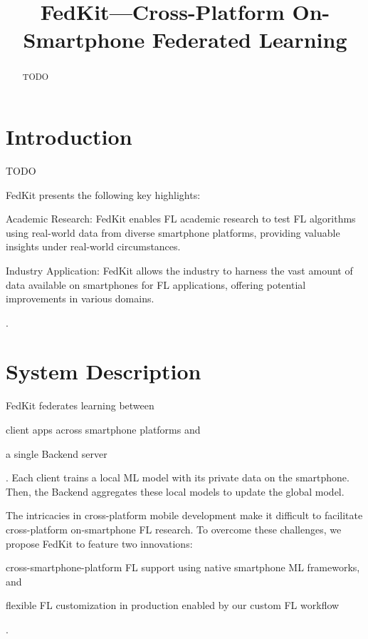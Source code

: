 \documentclass[letterpaper]{article} %
\title{FedKit---Cross-Platform On-Smartphone Federated Learning}
\author{}
\begin{document}
\maketitle

\begin{abstract}
    TODO
\end{abstract}

\section{Introduction}


TODO

FedKit presents the following key highlights:

\begin{enumerate*}[label=\arabic*)]
    \item Academic Research: FedKit enables FL academic research to test FL algorithms using real-world data from diverse smartphone platforms, providing valuable insights under real-world circumstances.
    \item Industry Application: FedKit allows the industry to harness the vast amount of data available on smartphones for FL applications, offering potential improvements in various domains.
\end{enumerate*}.


\section{System Description}

FedKit federates learning between
\begin{enumerate*}[label=\arabic*)]
    \item client apps across smartphone platforms and
    \item a single Backend server
\end{enumerate*}.
Each client trains a local ML model with its private data on the smartphone.
Then, the Backend aggregates these local models to update the global model.

The intricacies in cross-platform mobile development make it difficult to
facilitate cross-platform on-smartphone FL research.
To overcome these challenges,
we propose FedKit to feature two innovations:
\begin{enumerate*}[label=\arabic*)]
    \item cross-smartphone-platform FL support using
        native smartphone ML frameworks, and
    \item flexible FL customization in production enabled by
        our custom FL workflow
\end{enumerate*}.
\end{document}
